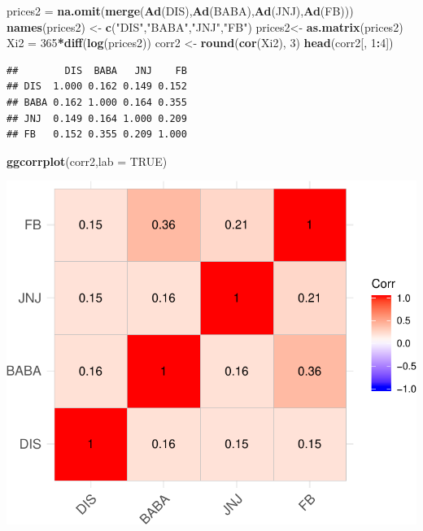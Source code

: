 \documentclass[]{article}
\newenvironment{Shaded}{\begin{snugshade}}{\end{snugshade}}
\newcommand{\KeywordTok}[1]{\textcolor[rgb]{0.13,0.29,0.53}{\textbf{#1}}}
\newcommand{\DataTypeTok}[1]{\textcolor[rgb]{0.13,0.29,0.53}{#1}}
\newcommand{\DecValTok}[1]{\textcolor[rgb]{0.00,0.00,0.81}{#1}}
\newcommand{\StringTok}[1]{\textcolor[rgb]{0.31,0.60,0.02}{#1}}
\newcommand{\OtherTok}[1]{\textcolor[rgb]{0.56,0.35,0.01}{#1}}
\newcommand{\OperatorTok}[1]{\textcolor[rgb]{0.81,0.36,0.00}{\textbf{#1}}}
\newcommand{\NormalTok}[1]{#1}
\begin{document}
\begin{Shaded}
\begin{Highlighting}[]
\NormalTok{prices2 =}\StringTok{ }\KeywordTok{na.omit}\NormalTok{(}\KeywordTok{merge}\NormalTok{(}\KeywordTok{Ad}\NormalTok{(DIS),}\KeywordTok{Ad}\NormalTok{(BABA),}\KeywordTok{Ad}\NormalTok{(JNJ),}\KeywordTok{Ad}\NormalTok{(FB))) }
\KeywordTok{names}\NormalTok{(prices2) <-}\StringTok{ }\KeywordTok{c}\NormalTok{(}\StringTok{"DIS"}\NormalTok{,}\StringTok{"BABA"}\NormalTok{,}\StringTok{"JNJ"}\NormalTok{,}\StringTok{"FB"}\NormalTok{)}
\NormalTok{prices2<-}\StringTok{ }\KeywordTok{as.matrix}\NormalTok{(prices2)}
\NormalTok{Xi2 =}\StringTok{ }\DecValTok{365}\OperatorTok{*}\KeywordTok{diff}\NormalTok{(}\KeywordTok{log}\NormalTok{(prices2))}
\NormalTok{corr2 <-}\StringTok{ }\KeywordTok{round}\NormalTok{(}\KeywordTok{cor}\NormalTok{(Xi2), }\DecValTok{3}\NormalTok{)}
\KeywordTok{head}\NormalTok{(corr2[, }\DecValTok{1}\OperatorTok{:}\DecValTok{4}\NormalTok{])}
\end{Highlighting}
\end{Shaded}

\begin{verbatim}
##        DIS  BABA   JNJ    FB
## DIS  1.000 0.162 0.149 0.152
## BABA 0.162 1.000 0.164 0.355
## JNJ  0.149 0.164 1.000 0.209
## FB   0.152 0.355 0.209 1.000
\end{verbatim}

\begin{Shaded}
\begin{Highlighting}[]
\KeywordTok{ggcorrplot}\NormalTok{(corr2,}\DataTypeTok{lab =} \OtherTok{TRUE}\NormalTok{)}
\end{Highlighting}
\end{Shaded}

\includegraphics{Markowitz_Research_Me_files/figure-latex/unnamed-chunk-5-1.pdf}
\end{document}
